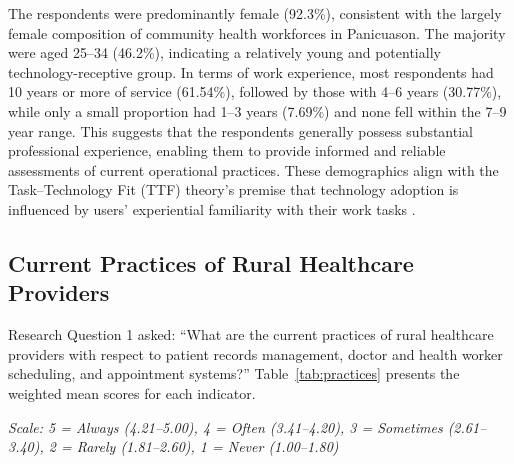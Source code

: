 \documentclass{research}
\begin{document}
The respondents were predominantly female (92.3\%), consistent with the largely female composition
of community health workforces in Panicuason. The majority were aged 25--34 (46.2\%), indicating
a relatively young and potentially technology-receptive group. In terms of work experience, most
respondents had 10 years or more of service (61.54\%), followed by those with 4--6 years
(30.77\%), while only a small proportion had 1--3 years (7.69\%) and none fell within the 7--9
year range. This suggests that the respondents generally possess substantial professional
experience, enabling them to provide informed and reliable assessments of current operational
practices. These demographics align with the Task--Technology Fit (TTF) theory's premise that
technology adoption is influenced by users' experiential familiarity with their work tasks
\cite{TTF_Newcastle}.

\subsection*{Current Practices of Rural Healthcare Providers}

Research Question 1 asked: ``What are the current practices of rural healthcare providers with
respect to patient records management, doctor and health worker scheduling, and appointment
systems?'' Table~\ref{tab:practices} presents the weighted mean scores for each indicator.

\textit{Scale: 5 = Always (4.21--5.00), 4 = Often (3.41--4.20), 3 = Sometimes (2.61--3.40),
2 = Rarely (1.81--2.60), 1 = Never (1.00--1.80)}
\end{document}
